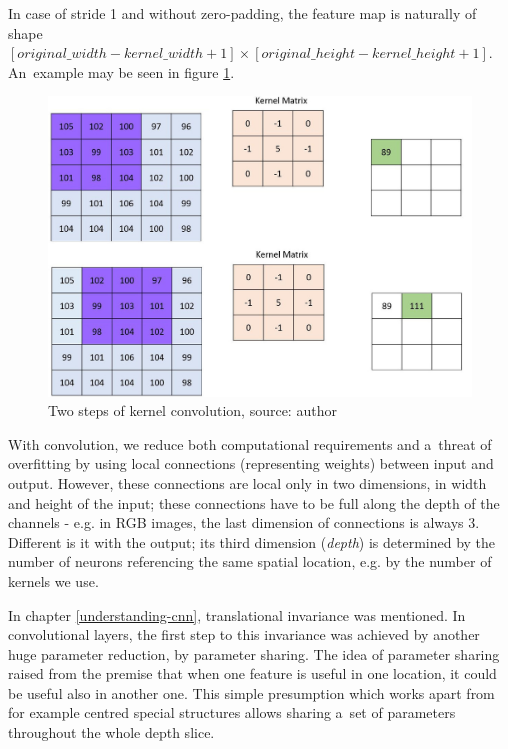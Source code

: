 In case of stride 1 and without zero-padding, the feature map is naturally of 
shape $[original\_width - kernel\_width + 1] \times [original\_height - 
kernel\_height + 1]$. An~example may be seen in figure \ref{fig:conv}. 

\begin{figure}[h]
   \centering
	\includegraphics[width=.8\linewidth]{./pictures/conv.jpg}
	\caption[Kernel convolution]{Two steps of kernel convolution, source: author}
      \label{fig:conv}
\end{figure}

With convolution, we reduce both computational requirements and a~threat of 
overfitting by using local connections (representing weights) between input and
output. However, these connections are local only in two dimensions, in width 
and height of the input; these connections have to be full along the depth of
the channels - e.g. in RGB images, the last dimension of connections is always
3. Different is it with the output; its third dimension (\textit{depth}) is 
determined by the number of neurons referencing the same spatial location, e.g.
by the number of kernels we use. 

In chapter \ref{understanding-cnn}, translational invariance was mentioned. In 
convolutional layers, the first step to this invariance was achieved by another
huge parameter reduction, by parameter sharing. The idea of parameter sharing
raised from the premise that when one feature is useful in one location, it
could be
useful also in another one. This simple presumption which works apart from for
example centred special structures allows sharing a~set of parameters 
throughout the whole depth slice. 

